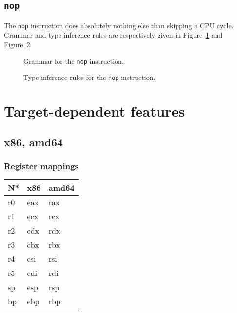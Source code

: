 \section{\texttt{nop}}\label{sec:nstar-instructionset-nop}

The \texttt{nop} instruction does absolutely nothing else than skipping a CPU cycle.
Grammar and type inference rules are respectively given in Figure~\ref{fig:nstar-instructionset-nop-grammar} and Figure~\ref{fig:nstar-instructionset-nop-typerules}.

\begin{figure}[H]
  \centering


  \caption{Grammar for the \texttt{nop} instruction.}
  \label{fig:nstar-instructionset-nop-grammar}
\end{figure}

\begin{figure}[H]
  \centering

  \begin{prooftree}
  \end{prooftree}

  \caption{Type inference rules for the \texttt{nop} instruction.}
  \label{fig:nstar-instructionset-nop-typerules}
\end{figure}

\chapter{Target-dependent features}\label{chap:nstar-specific}

\section{x86, amd64}\label{sec:nstar-specific-x86amd64}

\subsection{Register mappings}\label{subsec:nstar-specific-x86amd64-registers}

\begin{tabularx}{\textwidth}{Y Y Y}
  \toprule
  N* & x86 & amd64 \\
  \midrule
  r0 & eax & rax \\
  r1 & ecx & rcx \\
  r2 & edx & rdx \\
  r3 & ebx & rbx \\
  r4 & esi & rsi \\
  r5 & edi & rdi \\
  \cmidrule(lr){1-3}
  sp & esp & rsp \\
  bp & ebp & rbp \\
  \bottomrule
\end{tabularx}
